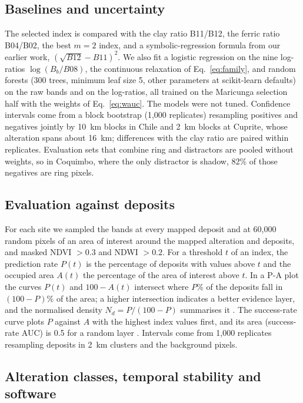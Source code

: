 \documentclass[pdflatex,sn-basic]{sn-jnl}
\begin{document}
\subsection{Baselines and uncertainty}
\label{sec:baselines}

The selected index is compared with the clay ratio B11/B12, the ferric ratio B04/B02, the best $m = 2$ index, and a symbolic-regression formula from our earlier work, $(\sqrt{B12} - B11)^2$. We also fit a logistic regression on the nine log-ratios $\log(B_b/B08)$, the continuous relaxation of Eq.~\ref{eq:family}, and random forests (300 trees, minimum leaf size 5, other parameters at scikit-learn defaults) on the raw bands and on the log-ratios, all trained on the Maricunga selection half with the weights of Eq.~\ref{eq:wauc}. The models were not tuned. Confidence intervals come from a block bootstrap (1{,}000 replicates) resampling positives and negatives jointly by \SI{10}{\kilo\meter} blocks in Chile and \SI{2}{\kilo\meter} blocks at Cuprite, whose alteration spans about \SI{16}{\kilo\meter}; differences with the clay ratio are paired within replicates. Evaluation sets that combine ring and distractors are pooled without weights, so in Coquimbo, where the only distractor is shadow, 82\% of those negatives are ring pixels.

\subsection{Evaluation against deposits}
\label{sec:pa}

For each site we sampled the bands at every mapped deposit and at 60{,}000 random pixels of an area of interest around the mapped alteration and deposits, and masked NDVI $>0.3$ and NDWI $>0.2$. For a threshold $t$ of an index, the prediction rate $P(t)$ is the percentage of deposits with values above $t$ and the occupied area $A(t)$ the percentage of the area of interest above $t$. In a P-A plot the curves $P(t)$ and $100 - A(t)$ intersect where $P$\% of the deposits fall in $(100-P)$\% of the area; a higher intersection indicates a better evidence layer, and the normalised density $N_d = P/(100-P)$ summarises it \citep{Yousefi2015}. The success-rate curve plots $P$ against $A$ with the highest index values first, and its area (success-rate AUC) is 0.5 for a random layer \citep{Chung2003}. Intervals come from 1{,}000 replicates resampling deposits in \SI{2}{\kilo\meter} clusters and the background pixels.

\subsection{Alteration classes, temporal stability and software}
\end{document}
